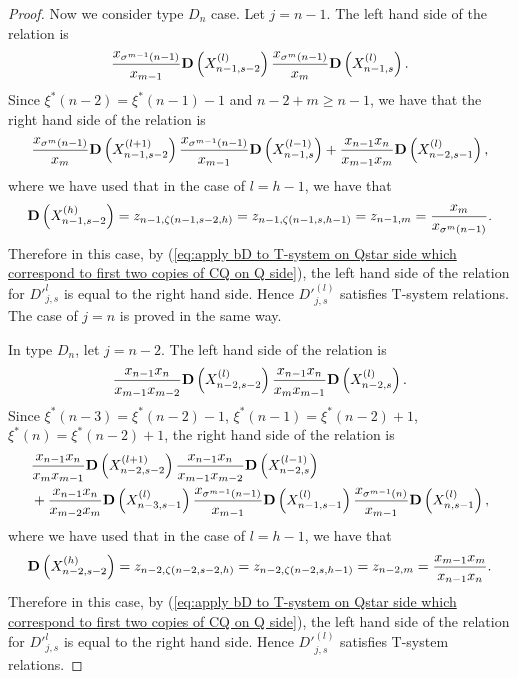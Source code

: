 \documentclass[10pt,a4paper]{amsart}
\begin{document}
\begin{proof}
Now we consider type $D_n$ case. Let $j=n-1$. The left hand side of the relation is 
\begin{align*}
\frac{x_{\sigma^{m-1}(n-1)}}{x_{m-1}} {\bf D}\left( X_{n-1,s-2}^{(l)} \right) \frac{x_{\sigma^{m}(n-1)}}{x_{m}} {\bf D}\left( X_{n-1,s}^{(l)} \right).
\end{align*}
Since $\xi^*(n-2) = \xi^*(n-1)-1$ and $n-2+m \ge n-1$, we have that the right hand side of the relation is
\begin{align*}
\frac{x_{\sigma^m(n-1)}}{x_{m}} {\bf D}\left( X_{n-1,s-2}^{(l+1)} \right) \frac{x_{\sigma^{m-1}(n-1)}}{x_{m-1}} {\bf D}\left( X_{n-1,s}^{(l-1)} \right) + \frac{x_{n-1}x_n}{x_{m-1}x_m} {\bf D}\left( X_{n-2,s-1}^{(l)} \right),
\end{align*}
where we have used that in the case of $l=h-1$, we have that 
\[
{\bf D}\left( X_{n-1,s-2}^{(h)}\right) = z_{n-1, \zeta(n-1,s-2,h)} = z_{n-1, \zeta(n-1, s, h-1)} = z_{n-1, m} = \frac{x_m}{x_{\sigma^m(n-1)}}.  
\]
Therefore in this case, by (\ref{eq:apply bD to T-system on Qstar side which correspond to first two copies of CQ on Q side}), the left hand side of the relation for ${D'}_{j,s}^{l}$ is equal to the right hand side. Hence ${D'}_{j,s}^{(l)}$ satisfies T-system relations. The case of $j=n$ is proved in the same way. 

In type $D_n$, let $j=n-2$. The left hand side of the relation is
\begin{align*}
\frac{x_{n-1}x_n}{x_{m-1}x_{m-2}} {\bf D}\left( X_{n-2,s-2}^{(l)} \right) \frac{x_{n-1}x_n}{x_{m}x_{m-1}} {\bf D}\left( X_{n-2,s}^{(l)} \right). 
\end{align*}
Since $\xi^*(n-3) = \xi^*(n-2)-1$, $\xi^*(n-1) = \xi^*(n-2)+1$, $\xi^*(n) = \xi^*(n-2)+1$, the right hand side of the relation is
\begin{align*}
&  \frac{x_{n-1}x_n}{x_{m}x_{m-1}} {\bf D}\left( X_{n-2,s-2}^{(l+1)} \right) \frac{x_{n-1}x_n}{x_{m-1}x_{m-2}}  {\bf D}\left( X_{n-2,s}^{(l-1)} \right) \\
& +   \frac{x_{n-1}x_n}{x_{m-2}x_m} {\bf D}\left( X_{n-3,s-1}^{(l)} \right) \frac{x_{\sigma^{m-1}(n-1)}}{x_{m-1}} {\bf D}\left( X_{n-1,s-1}^{(l)} \right) \frac{x_{\sigma^{m-1}(n)}}{x_{m-1}} {\bf D}\left( X_{n,s-1}^{(l)} \right),
\end{align*}
where we have used that in the case of $l=h-1$, we have that 
\begin{align*}
{\bf D}\left( X_{n-2,s-2}^{(h)} \right) = z_{n-2,\zeta(n-2,s-2,h)} = z_{n-2,\zeta(n-2,s,h-1)} = z_{n-2, m} = \frac{x_{m-1}x_m}{x_{n-1}x_n}.  
\end{align*}
Therefore in this case, by (\ref{eq:apply bD to T-system on Qstar side which correspond to first two copies of CQ on Q side}), the left hand side of the relation for ${D'}_{j,s}^{l}$ is equal to the right hand side. Hence ${D'}_{j,s}^{(l)}$ satisfies T-system relations.


\end{proof}
\end{document}
